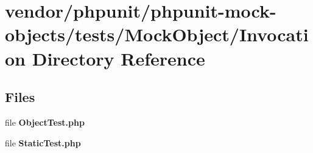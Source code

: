 \section{vendor/phpunit/phpunit-\/mock-\/objects/tests/\+Mock\+Object/\+Invocation Directory Reference}
\label{dir_5bc83029daf5d823a3c6b7688429e055}
\subsection*{Files}
\begin{DoxyCompactItemize}
\item 
file {\bf Object\+Test.\+php}
\item 
file {\bf Static\+Test.\+php}
\end{DoxyCompactItemize}
